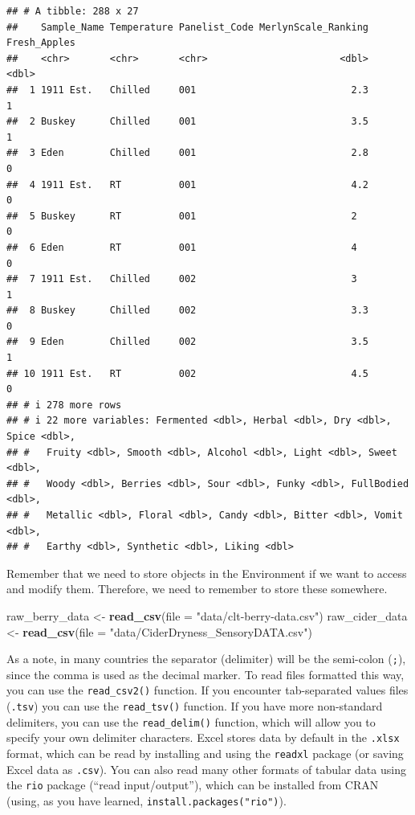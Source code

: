 \documentclass[
]{book}
\newenvironment{Shaded}{\begin{snugshade}}{\end{snugshade}}
\newcommand{\AttributeTok}[1]{\textcolor[rgb]{0.13,0.29,0.53}{#1}}
\newcommand{\FunctionTok}[1]{\textcolor[rgb]{0.13,0.29,0.53}{\textbf{#1}}}
\newcommand{\NormalTok}[1]{#1}
\newcommand{\OtherTok}[1]{\textcolor[rgb]{0.56,0.35,0.01}{#1}}
\newcommand{\StringTok}[1]{\textcolor[rgb]{0.31,0.60,0.02}{#1}}
\begin{document}
\begin{verbatim}
## # A tibble: 288 x 27
##    Sample_Name Temperature Panelist_Code MerlynScale_Ranking Fresh_Apples
##    <chr>       <chr>       <chr>                       <dbl>        <dbl>
##  1 1911 Est.   Chilled     001                           2.3            1
##  2 Buskey      Chilled     001                           3.5            1
##  3 Eden        Chilled     001                           2.8            0
##  4 1911 Est.   RT          001                           4.2            0
##  5 Buskey      RT          001                           2              0
##  6 Eden        RT          001                           4              0
##  7 1911 Est.   Chilled     002                           3              1
##  8 Buskey      Chilled     002                           3.3            0
##  9 Eden        Chilled     002                           3.5            1
## 10 1911 Est.   RT          002                           4.5            0
## # i 278 more rows
## # i 22 more variables: Fermented <dbl>, Herbal <dbl>, Dry <dbl>, Spice <dbl>,
## #   Fruity <dbl>, Smooth <dbl>, Alcohol <dbl>, Light <dbl>, Sweet <dbl>,
## #   Woody <dbl>, Berries <dbl>, Sour <dbl>, Funky <dbl>, FullBodied <dbl>,
## #   Metallic <dbl>, Floral <dbl>, Candy <dbl>, Bitter <dbl>, Vomit <dbl>,
## #   Earthy <dbl>, Synthetic <dbl>, Liking <dbl>
\end{verbatim}

Remember that we need to store objects in the Environment if we want to access and modify them. Therefore, we need to remember to store these somewhere.

\begin{Shaded}
\begin{Highlighting}[]
\NormalTok{raw\_berry\_data }\OtherTok{\textless{}{-}} \FunctionTok{read\_csv}\NormalTok{(}\AttributeTok{file =} \StringTok{"data/clt{-}berry{-}data.csv"}\NormalTok{)}
\NormalTok{raw\_cider\_data }\OtherTok{\textless{}{-}} \FunctionTok{read\_csv}\NormalTok{(}\AttributeTok{file =} \StringTok{"data/CiderDryness\_SensoryDATA.csv"}\NormalTok{)}
\end{Highlighting}
\end{Shaded}

As a note, in many countries the separator (delimiter) will be the semi-colon (\texttt{;}), since the comma is used as the decimal marker. To read files formatted this way, you can use the \texttt{read\_csv2()} function. If you encounter tab-separated values files (\texttt{.tsv}) you can use the \texttt{read\_tsv()} function. If you have more non-standard delimiters, you can use the \texttt{read\_delim()} function, which will allow you to specify your own delimiter characters. Excel stores data by default in the \texttt{.xlsx} format, which can be read by installing and using the \texttt{readxl} package (or saving Excel data as \texttt{.csv}). You can also read many other formats of tabular data using the \texttt{rio} package (``read input/output''), which can be installed from CRAN (using, as you have learned, \texttt{install.packages("rio")}).
\end{document}
